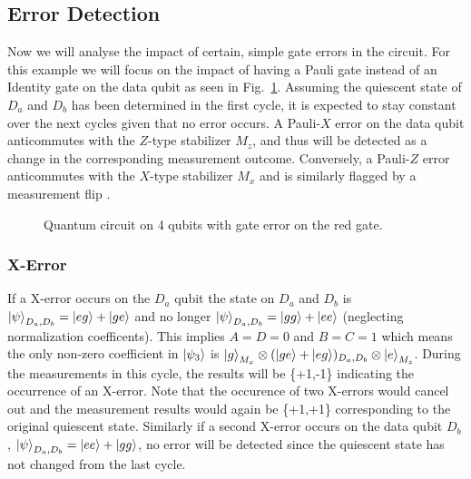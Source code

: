 \documentclass[9pt,a4paper,twocolumn,twoside]{tau-class/tau}
\begin{document}
\subsection{Error Detection}
Now we will analyse the impact of certain, simple gate errors in the circuit. For this example we will focus on the impact of having a Pauli gate instead of an Identity gate on the data qubit as seen in Fig.~\ref{fig:quantum circuit 4 qubits}. Assuming the quiescent state of $D_a$ and $D_b$ has been determined in the first cycle, it is expected to stay constant over the next cycles given that no error occurs. A Pauli-$X$ error on the data qubit anticommutes with the $Z$-type stabilizer $M_z$, and thus will be detected as a change in the corresponding measurement outcome. Conversely, a Pauli-$Z$ error anticommutes with the $X$-type stabilizer $M_x$ and is similarly flagged by a measurement flip \cite{fowler2012surface}. 
\begin{figure}[ht]
\centering
{}
\caption{Quantum circuit on 4 qubits with gate error on the red gate.}
\label{fig:quantum circuit 4 qubits}
\end{figure}
\subsubsection*{X-Error}
If a X-error occurs on the $D_a$ qubit the state on $D_a$ and $D_b$ is  $\ket{\psi}_{D_a,D_b}=\ket{eg} + \ket{ge}$ and no longer $\ket{\psi}_{D_a,D_b}=\ket{gg} + \ket{ee}$ (neglecting normalization coefficents). This implies $A=D=0$ and $B = C = 1$ which means the only non-zero coefficient in $\ket{\psi_3}$ is \(\ket{g}_{M_x} \otimes (\ket{ge}+\ket{eg})_{D_a,D_b} \otimes \ket{e}_{M_z}\). During the measurements in this cycle, the results will be \{+1,-1\} indicating the occurrence of an X-error. Note that the occurence of two X-errors would cancel out and the measurement results would again be \{+1,+1\} corresponding to the original quiescent state. Similarly if a second X-error occurs on the data qubit $D_b$, $\ket{\psi}_{D_a,D_b}=\ket{ee} + \ket{gg}$, no error will be detected since the quiescent state has not changed from the last cycle. 
\end{document}
